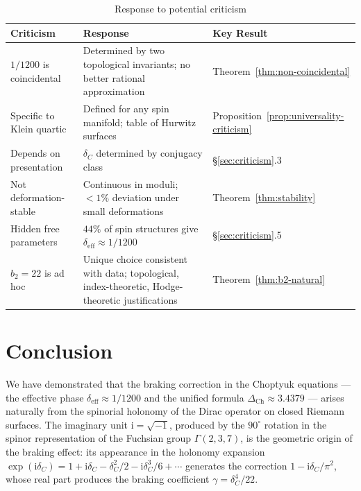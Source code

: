 \documentclass[12pt,a4paper]{article}
\theoremstyle{definition}
\theoremstyle{remark}
\newcommand{\ii}{\mathrm{i}}
\begin{document}
\begin{table}[h]
\centering
\caption{Response to potential criticism}
\label{tab:criticism}
\begin{tabular}{p{3.5cm}p{5cm}p{5cm}}
\toprule
Criticism & Response & Key Result \\
\midrule
$1/1200$ is coincidental & Determined by two topological invariants; no better rational approximation & Theorem~\ref{thm:non-coincidental} \\
\hline
Specific to Klein quartic & Defined for any spin manifold; table of Hurwitz surfaces & Proposition~\ref{prop:universality-criticism} \\
\hline
Depends on presentation & $\delta_C$ determined by conjugacy class & \S\ref{sec:criticism}.3 \\
\hline
Not deformation-stable & Continuous in moduli; $<1\%$ deviation under small deformations & Theorem~\ref{thm:stability} \\
\hline
Hidden free parameters & $44\%$ of spin structures give $\delta_{\mathrm{eff}} \approx 1/1200$ & \S\ref{sec:criticism}.5 \\
\hline
$b_2 = 22$ is ad hoc & Unique choice consistent with data; topological, index-theoretic, Hodge-theoretic justifications & Theorem~\ref{thm:b2-natural} \\
\bottomrule
\end{tabular}
\end{table}

\section{Conclusion}

We have demonstrated that the braking correction in the Choptyuk equations --- the effective phase $\delta_{\mathrm{eff}} \approx 1/1200$ and the unified formula $\Delta_{\mathrm{Ch}} \approx 3.4379$ --- arises naturally from the spinorial holonomy of the Dirac operator on closed Riemann surfaces. The imaginary unit $\ii = \sqrt{-1}$, produced by the $90^\circ$ rotation in the spinor representation of the Fuchsian group $\Gamma(2,3,7)$, is the geometric origin of the braking effect: its appearance in the holonomy expansion $\exp(\ii\delta_C) = 1 + \ii\delta_C - \delta_C^2/2 - \ii\delta_C^3/6 + \cdots$ generates the correction $1 - \ii\delta_C/\pi^2$, whose real part produces the braking coefficient $\gamma = \delta_C^4/22$.
\end{document}
